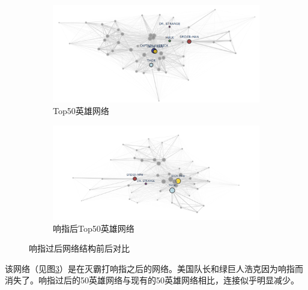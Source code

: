 \documentclass[12pt]{xjtureport}
\begin{document}
\begin{figure}[htbp]
    \centering
    \begin{subfigure}[b]{0.49\textwidth}
        \centering
        \includegraphics[width=\linewidth]{figures/top 50 Heroes Network.png}
        \caption{Top50英雄网络}
        \label{fig:sub11}
        \end{subfigure}
        \hfill
    \begin{subfigure}[b]{0.49\textwidth}
        \centering
        \includegraphics[width=\textwidth]{figures/响指过后top 50 Heroes Network.png}
        \caption{响指后Top50英雄网络}
        \label{fig:sub22}
    \end{subfigure}
    \caption{响指过后网络结构前后对比}
    \label{fig:combined2}
  \end{figure}
  

该网络（见图\ref{fig:combined2}）是在灭霸打响指之后的网络。美国队长和绿巨人浩克因为响指而消失了。响指过后的50英雄网络与现有的50英雄网络相比，连接似乎明显减少。
\end{document}
